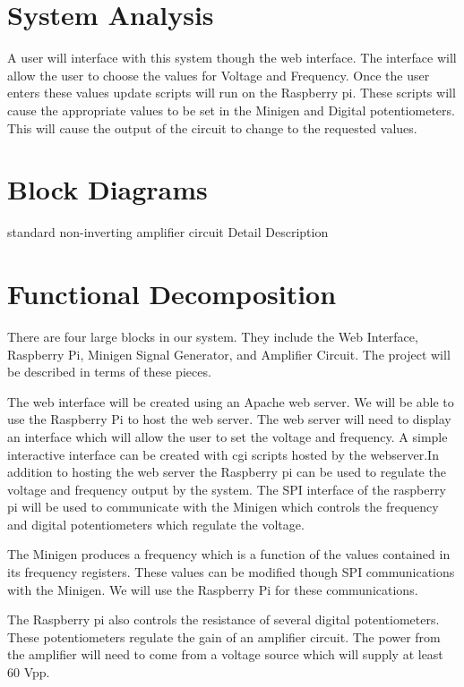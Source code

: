 \documentclass{article}	%
\begin{document}
\begin{multicols}{2}
\section{System Analysis}
A user will interface with this system though the web interface. The interface will allow the user to choose the values for Voltage and Frequency. Once the user enters these values update scripts will run on the Raspberry pi. These scripts will cause the appropriate values to be set in the Minigen and Digital potentiometers. This will cause the output of the circuit to change to the requested values.

\section{Block Diagrams}

standard non-inverting amplifier circuit 
Detail Description

\section{Functional Decomposition}
There are four large blocks in our system. They include the Web Interface, Raspberry Pi, Minigen Signal Generator, and Amplifier Circuit. The project will be described in terms of these pieces.

The web interface will be created using an Apache web server. We will be able to use the Raspberry Pi to host the web server. The web server will need to display an interface which will allow the user to set the voltage and frequency. A simple interactive interface can be created with cgi scripts hosted by the webserver.In addition to hosting the web server the Raspberry pi can be used to regulate the voltage and frequency output by the system. The SPI interface of the raspberry pi will be used to communicate with the Minigen which controls the frequency and digital potentiometers which regulate the voltage.

The Minigen produces a frequency which is a function of the values contained in its frequency registers. These values can be modified though SPI communications with the Minigen. We will use the Raspberry Pi for these communications.

The Raspberry pi also controls the resistance of several digital potentiometers. These potentiometers regulate the gain of an amplifier circuit. The power from the amplifier will need to come from a voltage source which will supply at least 60 Vpp.


\end{multicols}
\end{document}
